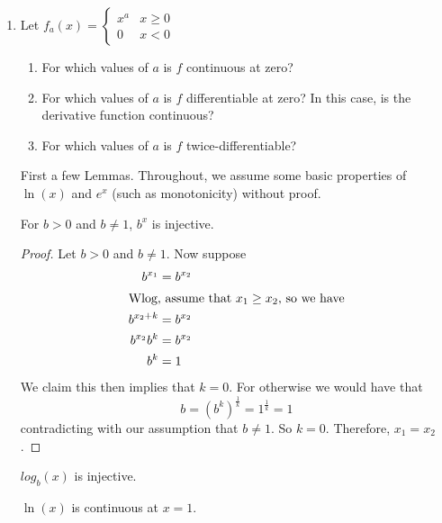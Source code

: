 \begin{enumerate}
    \item Let \( f_{a}(x) = \begin{cases} x^{a} & x \geq 0 \\ 0 & x < 0 \end{cases} \)
    \begin{enumerate}
        \item For which values of \( a \) is \( f \) continuous at zero?
        \item For which values of \( a \) is \( f \) differentiable at zero? In this case, is the derivative function continuous?
        \item For which values of \( a \) is \( f \) twice-differentiable?
    \end{enumerate}
    First a few Lemmas. Throughout, we assume some basic properties of \( \ln(x) \) and \( e^x \) (such as monotonicity) without proof.
    \begin{lemma}
     For \( b > 0 \) and \( b \neq 1 \), \( b^{x} \) is injective.
    \end{lemma}
    
    \begin{proof}
    Let \( b>0 \) and \( b \neq 1 \). Now suppose
    \begin{align*}
        b^{x_{1}} &= b^{x_{2}} \\
        \intertext{Wlog, assume that \( x_{1} \geq x_{2} \), so we have}
        b^{x_{2}+k} &= b^{x_{2}} \\
        b^{x_{2}}b^k &= b^{x_{2}} \\
        b^k &= 1 \\
    \end{align*}
    We claim this then implies that \( k=0 \). For otherwise we would have that
    \[
    b = \left( b^k \right)^{\frac{1}{k}} = 1^\frac{1}{k} = 1
    \]
    contradicting with our assumption that \( b \neq 1 \). So \( k = 0 \). Therefore, \( x_{1} = x_{2} \).
    \end{proof}
    
    \begin{corollary}
    \( log_{b}(x) \) is injective.
    \end{corollary}
    
    \begin{lemma}
    \( \ln(x) \) is continuous at \( x =1 \).
    \end{lemma}
    

\end{enumerate}
